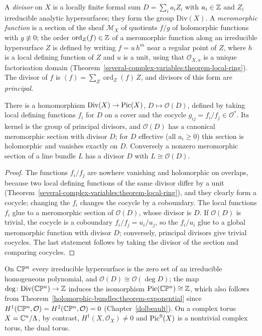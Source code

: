 \begin{definition}\label{holomorphic-bundles:definition-divisor}
A \emph{divisor} on $X$ is a locally finite formal sum $D = \sum_ia_iZ_i$ with $a_i \in \mathbb{Z}$ and $Z_i$ irreducible analytic hypersurfaces; they form the group $\mathrm{Div}(X)$. A \emph{meromorphic function}
is a section of the sheaf $\mathcal{M}_X$ of quotients $f/g$ of holomorphic functions with $g \not\equiv 0$; the order $\operatorname{ord}_Z(f) \in \mathbb{Z}$ of a meromorphic function along an irreducible
hypersurface $Z$ is defined by writing $f = u\,h^m$ near a regular point of $Z$, where $h$ is a local defining function of $Z$ and $u$ is a unit, using that $\mathcal{O}_{X,x}$ is a unique factorisation domain
(Theorem~\ref{several-complex-variables:theorem-local-ring}). The divisor of $f$ is $(f) = \sum_Z\operatorname{ord}_Z(f)\,Z$, and divisors of this form are \emph{principal}.
\end{definition}

\begin{proposition}\label{holomorphic-bundles:proposition-divisor-line-bundle}
There is a homomorphism $\mathrm{Div}(X) \to \operatorname{Pic}(X)$, $D \mapsto \mathcal{O}(D)$, defined by taking local defining functions $f_i$ for $D$ on a cover and the cocycle $g_{ij} = f_i/f_j \in \mathcal{O}^*$. Its kernel
is the group of principal divisors, and $\mathcal{O}(D)$ has a canonical meromorphic section with divisor $D$; for $D$ effective (all $a_i \geq 0$) this section is holomorphic and vanishes exactly on $D$.
Conversely a nonzero meromorphic section of a line bundle $L$ has a divisor $D$ with $L \cong \mathcal{O}(D)$.
\end{proposition}

\begin{proof}
The functions $f_i/f_j$ are nowhere vanishing and holomorphic on overlaps, because two local defining functions of the same divisor differ by a unit
(Theorem~\ref{several-complex-variables:theorem-local-ring}), and they clearly form a cocycle; changing the $f_i$ changes the cocycle by a coboundary. The local functions $f_i$ glue to a meromorphic section
of $\mathcal{O}(D)$, whose divisor is $D$. If $\mathcal{O}(D)$ is trivial, the cocycle is a coboundary $f_i/f_j = u_i/u_j$, so the $f_i/u_i$ glue to a global meromorphic function with divisor $D$; conversely,
principal divisors give trivial cocycles. The last statement follows by taking the divisor of the section and comparing cocycles.
\end{proof}

\begin{example}\label{holomorphic-bundles:example-divisors-projective}
On $\mathbb{C}\mathbb{P}^n$ every irreducible hypersurface is the zero set of an irreducible homogeneous polynomial, and $\mathcal{O}(D) \cong \mathcal{O}(\deg D)$; the map $\deg \colon \mathrm{Div}(\mathbb{C}\mathbb{P}^n) \to \mathbb{Z}$
induces the isomorphism $\operatorname{Pic}(\mathbb{C}\mathbb{P}^n) \cong \mathbb{Z}$, which also follows from Theorem~\ref{holomorphic-bundles:theorem-exponential} since $H^1(\mathbb{C}\mathbb{P}^n, \mathcal{O}) = H^2(\mathbb{C}\mathbb{P}^n, \mathcal{O}) = 0$
(Chapter~\ref{dolbeault}). On a complex torus $X = \mathbb{C}^n/\Lambda$, by contrast, $H^1(X, \mathcal{O}_X) \neq 0$ and $\operatorname{Pic}^0(X)$ is a nontrivial complex torus, the dual torus.
\end{example}

